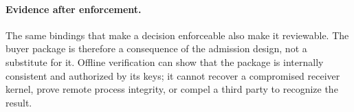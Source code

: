 \paragraph{Evidence after enforcement.}
The same bindings that make a decision enforceable also make it reviewable.
The buyer package is therefore a consequence of the admission design, not a
substitute for it. Offline verification can show that the package is internally
consistent and authorized by its keys; it cannot recover a compromised
receiver kernel, prove remote process integrity, or compel a third party to
recognize the result.
